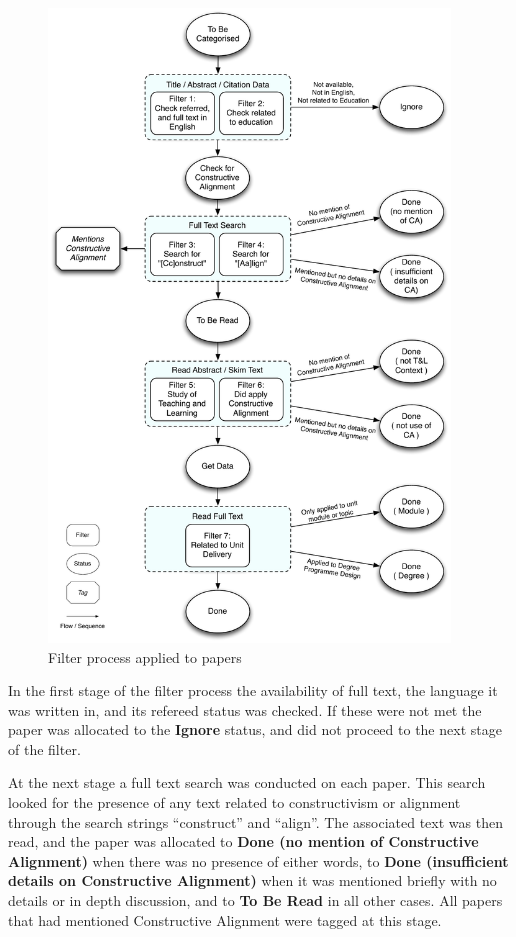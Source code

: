 \begin{figure}[tbph]
	\centering
	\includegraphics[width=0.95\textwidth]{FilterProcess}
	\caption{Filter process applied to papers}
	\label{fig:filter_proc}
\end{figure}

In the first stage of the filter process the availability of full text, the language it was written in, and its refereed status was checked. If these were not met the paper was allocated to the \textbf{Ignore} status, and did not proceed to the next stage of the filter. 

At the next stage a full text search was conducted on each paper. This search looked for the presence of any text related to constructivism or alignment through the search strings ``construct'' and ``align''. The associated text was then read, and the paper was allocated to \textbf{Done (no mention of Constructive Alignment)} when there was no presence of either words, to \textbf{Done (insufficient details on Constructive Alignment)} when it was mentioned briefly with no details or in depth discussion, and to \textbf{To Be Read} in all other cases. All papers that had mentioned Constructive Alignment were tagged at this stage.

